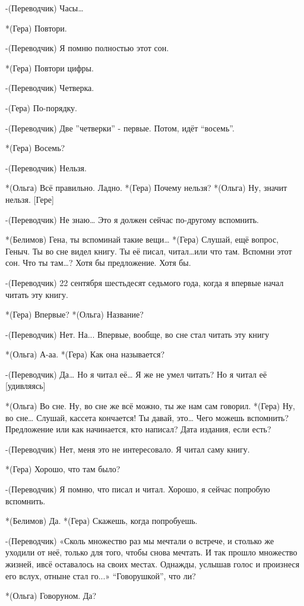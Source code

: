 -(Переводчик) Часы… 

*(Гера) Повтори.

-(Переводчик) Я помню полностью этот сон.

*(Гера) Повтори цифры.

-(Переводчик) Четверка.

-(Гера) По-порядку.

-(Переводчик) Две ”четверки” - первые. Потом, идёт “восемь”.

*(Гера) Восемь?

-(Переводчик) Нельзя.

*(Ольга) Всё правильно. Ладно.
*(Гера) Почему нельзя?
*(Ольга) Ну, значит нельзя. [Гере]

-(Переводчик) Не знаю… Это я должен сейчас по-другому вспомнить.

*(Белимов) Гена, ты вспоминай такие вещи…
*(Гера) Слушай, ещё вопрос, Геныч. Ты во сне видел книгу. Ты её писал, читал…или что там. Вспомни этот сон. Что ты там…? Хотя бы предложение. Хотя бы.

-(Переводчик) 22 сентября шестьдесят седьмого года, когда я впервые начал читать эту книгу.

*(Гера) Впервые?
*(Ольга) Название?

-(Переводчик) Нет. На... Впервые, вообще, во сне стал читать эту книгу

*(Ольга) А-аа.
*(Гера) Как она называется?

-(Переводчик) Да… Но я читал её… Я же не умел читать? Но я читал её [удивляясь]

*(Ольга) Во сне. Ну, во сне же всё можно, ты же нам сам говорил.
*(Гера) Ну, во сне… Слушай, кассета кончается! Ты давай, это… Чего можешь вспомнить? Предложение или как начинается, кто написал? Дата издания, если есть?

-(Переводчик) Нет, меня это не интересовало. Я читал саму книгу.

*(Гера) Хорошо, что там было?

-(Переводчик) Я помню, что писал и читал. Хорошо, я сейчас попробую вспомнить.

*(Белимов) Да.
*(Гера) Скажешь, когда попробуешь.

-(Переводчик) «Сколь множество раз мы мечтали о встрече, и столько же  уходили от неё, только для того, чтобы снова мечтать. И так прошло множество жизней, ивсё оставалось на своих местах. Однажды, услышав голос и произнеся его вслух, отныне стал го...» “Говорушкой”, что ли?

*(Ольга) Говоруном. Да?

